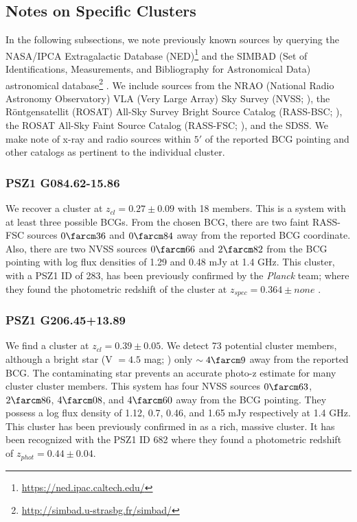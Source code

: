 \documentclass[apj, revtex4-1]{emulateapj}
\begin{document}
\subsection{Notes on Specific Clusters}
In the following subsections, we note previously known sources by querying the NASA/IPCA Extragalactic Database (NED)\footnote{\url{https://ned.ipac.caltech.edu/}} and the SIMBAD (Set of Identifications, Measurements, and Bibliography for Astronomical Data) astronomical database\footnote{\url{http://simbad.u-strasbg.fr/simbad/}} \citep{Wenger2000}. We include sources from the NRAO (National Radio Astronomy Observatory) VLA (Very Large Array) Sky Survey (NVSS; \citealt{Condon1998}), the R\"{o}ntgensatellit (ROSAT) All-Sky Survey Bright Source Catalog (RASS-BSC; \citealt{Voges1999a}), the ROSAT All-Sky Faint Source Catalog (RASS-FSC; \citealt{Voges2000}), and the SDSS. We make note of x-ray and radio sources within $5'$ of the reported BCG pointing and other catalogs as pertinent to the individual cluster.

\subsubsection{PSZ1 G084.62-15.86}
We recover a cluster at $z_{cl} = 0.27 \pm 0.09$ with 18 members. This is a system with at least three possible BCGs. From the chosen BCG, there are two faint RASS-FSC sources $0\farcm36$ and $0\farcm84$ away from the reported BCG coordinate. Also, there are two NVSS sources $0\farcm66$ and $2\farcm82$ from the BCG pointing with log flux densities of 1.29 and 0.48 mJy at 1.4 GHz. This cluster, with a PSZ1 ID of 283, has been previously confirmed by the \textit{Planck} team; where they found the photometric redshift of the cluster at $z_{spec} = 0.364 \pm none$ \citep{PlanckCollaboration2016a}.

\subsubsection{PSZ1 G206.45+13.89}
We find a cluster at $z_{cl} = 0.39 \pm 0.05$. We detect 73 potential cluster members, although a bright star (V $= 4.5$ mag; \citealt{Hog2000}) only $\sim4\farcm9$ away from the reported BCG. The contaminating star prevents an accurate photo-z estimate for many cluster cluster members. This system has four NVSS sources $0\farcm63$, $2\farcm86$, $4\farcm08$, and $4\farcm60$ away from the BCG pointing. They possess a log flux density of 1.12, 0.7, 0.46, and 1.65 mJy respectively at 1.4 GHz. This cluster has been previously confirmed in \citep{Barrena2018} as a rich, massive cluster. It has been recognized with the PSZ1 ID 682 where they found a photometric redshift of $z_{phot} = 0.44 \pm 0.04$.
\end{document}

